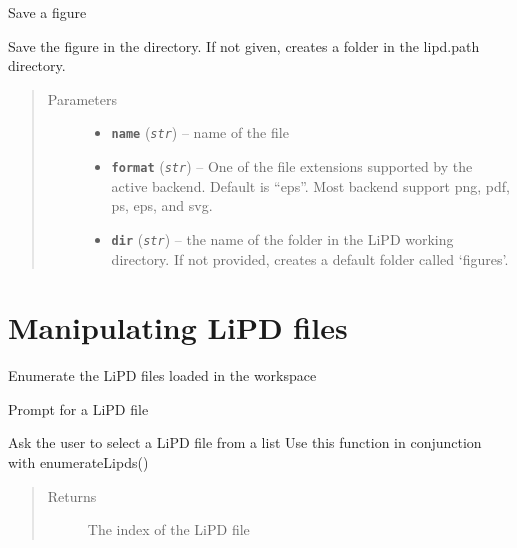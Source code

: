 \documentclass[letterpaper,10pt,english]{sphinxmanual}
\begin{document}
\begin{fulllineitems}
\label{LIPDutils:pyleoclim.saveFigure}
Save a figure

Save the figure in the directory. If not given, creates a folder in the
lipd.path directory.
\begin{quote}\begin{description}
\item[{Parameters}] \leavevmode\begin{itemize}
\item {} 
\textbf{\texttt{name}} (\emph{\texttt{str}}) -- name of the file

\item {} 
\textbf{\texttt{format}} (\emph{\texttt{str}}) -- One of the file extensions supported by the active
backend. Default is ``eps''. Most backend support png, pdf, ps, eps,
and svg.

\item {} 
\textbf{\texttt{dir}} (\emph{\texttt{str}}) -- the name of the folder in the LiPD working directory.
If not provided, creates a default folder called `figures'.

\end{itemize}

\end{description}\end{quote}

\end{fulllineitems}



\section{Manipulating LiPD files}
\label{LIPDutils:id1}

\begin{fulllineitems}
\label{LIPDutils:pyleoclim.enumerateLipds}
Enumerate the LiPD files loaded in the workspace

\end{fulllineitems}


\begin{fulllineitems}
\label{LIPDutils:pyleoclim.promptForLipd}
Prompt for a LiPD file

Ask the user to select a LiPD file from a list
Use this function in conjunction with enumerateLipds()
\begin{quote}\begin{description}
\item[{Returns}] \leavevmode
The index of the LiPD file

\end{description}\end{quote}

\end{fulllineitems}
\end{document}
